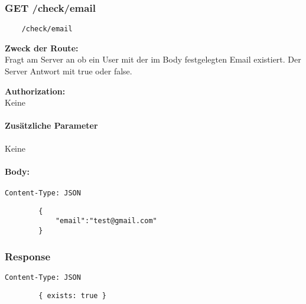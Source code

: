 \label{/other}

\newpage
\subsubsection{GET /check/email}

\begin{lstlisting}
    /check/email
\end{lstlisting}

\textbf{Zweck der Route:} \\
Fragt am Server an ob ein User mit der im Body
festgelegten Email existiert. Der Server Antwort mit
true oder false.

\textbf{Authorization:} \\
Keine

\paragraph{Zusätzliche Parameter}
Keine

\paragraph{Body:}
\begin{code}
    \lstinline{Content-Type: JSON}
    \begin{lstlisting}
        {
            "email":"test@gmail.com"
        }
    \end{lstlisting}
    \caption{Body der Check-Email-Route}
\end{code}

\subsubsection{Response}

\begin{code}
    \lstinline{Content-Type: JSON}
    \begin{lstlisting}
        { exists: true }
    \end{lstlisting}
    \caption{Response der Check-Email-Route}
\end{code}

\pagebreak
